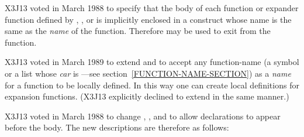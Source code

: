 \begin{defmac}
\begin{newer}
X3J13 voted in March 1988 
to specify that the body of each function or expander function defined
by , , or 
is implicitly enclosed in a  construct
whose name is the same as the \emph{name} of the function.
Therefore  may be used to exit from the function.
\end{newer}

\begin{newer}
X3J13 voted in March 1989  to extend  and 
to accept any function-name (a symbol or a list
whose \emph{car} is ---see section~\ref{FUNCTION-NAME-SECTION}) as a \emph{name}
for a function to be locally defined.  In this way one can create local definitions
for  expansion functions.  (X3J13 explicitly declined to extend
 in the same manner.)
\end{newer}

\begin{new}
X3J13 voted in March 1988
to change , , and 
to allow declarations to appear before the body.
The new descriptions are therefore as follows:
\end{new}
\end{defmac}

